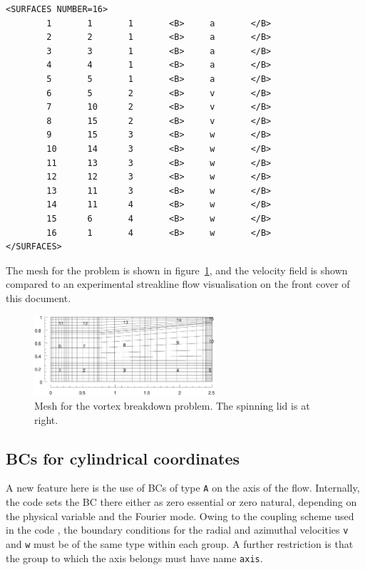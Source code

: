 \documentclass[11pt,a4paper]{report}
\begin{document}
{\begin{verbatim}
<SURFACES NUMBER=16>
        1       1       1       <B>     a       </B>
        2       2       1       <B>     a       </B>
        3       3       1       <B>     a       </B>
        4       4       1       <B>     a       </B>
        5       5       1       <B>     a       </B>
        6       5       2       <B>     v       </B>
        7       10      2       <B>     v       </B>
        8       15      2       <B>     v       </B>
        9       15      3       <B>     w       </B>
        10      14      3       <B>     w       </B>
        11      13      3       <B>     w       </B>
        12      12      3       <B>     w       </B>
        13      11      3       <B>     w       </B>
        14      11      4       <B>     w       </B>
        15      6       4       <B>     w       </B>
        16      1       4       <B>     w       </B>
</SURFACES>
\end{verbatim}
}

The mesh for the problem is shown in figure~\ref{vb1msh}, and the
velocity field is shown compared to an experimental streakline flow
visualisation on the front cover of this document.
\begin{figure}
\begin{center}
\includegraphics[width=0.6\textwidth]{vb1mesh.eps}
\end{center}
\caption{
\label{vb1msh}
  Mesh for the vortex breakdown problem.  The spinning lid is at right.
  }
\end{figure}

\subsection{BCs for cylindrical coordinates}
\label{sec.cbcs}

A new feature here is the use of BCs of type \verb+A+ on the axis of
the flow.  Internally, the code sets the BC there either as zero
essential or zero natural, depending on the physical variable and the
Fourier mode.  Owing to the coupling scheme used in the code
\citep{blsh04}, the boundary conditions for the radial and azimuthal
velocities \verb+v+ and \verb+w+ must be of the same type within each
group.  A further restriction is that the group to which the axis
belongs must have name \verb+axis+.
\end{document}
